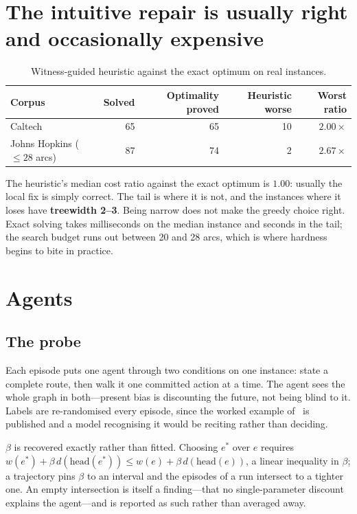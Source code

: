 \documentclass[10pt]{article}
\begin{document}
\section{The intuitive repair is usually right and occasionally expensive}
\label{sec:c2}

\begin{table}[H]
\centering
\begin{tabular}{lrrrr}
\toprule
Corpus & Solved & Optimality proved & Heuristic worse & Worst ratio \\
\midrule
Caltech                        & 65 & 65 & 10 & $\mathbf{2.00\times}$ \\
Johns Hopkins ($\leq 28$ arcs) & 87 & 74 &  2 & $\mathbf{2.67\times}$ \\
\bottomrule
\end{tabular}
\caption{Witness-guided heuristic against the exact optimum on real instances.}
\label{tab:solvers}
\end{table}

The heuristic's median cost ratio against the exact optimum is $1.00$: usually the
local fix is simply correct. The tail is where it is not, and the instances where it
loses have \textbf{treewidth 2--3}. Being narrow does not make the greedy choice
right. Exact solving takes milliseconds on the median instance and seconds in the
tail; the search budget runs out between 20 and 28 arcs, which is where hardness
begins to bite in practice.

\section{Agents}
\label{sec:agents}

\subsection{The probe}

Each episode puts one agent through two conditions on one instance: state a complete
route, then walk it one committed action at a time. The agent sees the whole graph in
both---present bias is discounting the future, not being blind to it. Labels are
re-randomised every episode, since the worked example of~\cite{belova2026} is
published and a model recognising it would be reciting rather than deciding.

$\beta$ is recovered exactly rather than fitted. Choosing $e^\ast$ over $e$ requires
$w(e^\ast) + \beta\, d(\mathrm{head}(e^\ast)) \leq w(e) + \beta\, d(\mathrm{head}(e))$,
a linear inequality in $\beta$; a trajectory pins $\beta$ to an interval and the
episodes of a run intersect to a tighter one. An empty intersection is itself a
finding---that no single-parameter discount explains the agent---and is reported as
such rather than averaged away.
\end{document}
